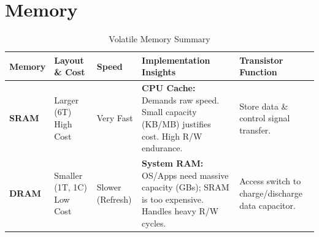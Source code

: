 \documentclass[10pt]{article}
\begin{document}
\section*{Memory}

\begin{table}[H]
    \centering
    \footnotesize %
    \renewcommand{\arraystretch}{1.2} %
    \begin{tabular}{@{} l p{2.2cm} l p{4.5cm} p{3.5cm} @{}}
        \toprule
        \textbf{Memory} & \textbf{Layout \& Cost} & \textbf{Speed} & \textbf{Implementation Insights} & \textbf{Transistor Function} \\
        \midrule
        \textbf{SRAM} & 
        Larger (6T) \newline High Cost & 
        Very Fast & 
        \textbf{CPU Cache:} Demands raw speed. Small capacity (KB/MB) justifies cost. High R/W endurance. & 
        Store data \& control signal transfer. \\
        
        \textbf{DRAM} & 
        Smaller (1T, 1C) \newline Low Cost & 
        Slower \newline (Refresh) & 
        \textbf{System RAM:} OS/Apps need massive capacity (GBs); SRAM is too expensive. Handles heavy R/W cycles. & 
        Access switch to charge/discharge data capacitor. \\
        \bottomrule
    \end{tabular}
    \caption{Volatile Memory Summary}
\end{table}
\end{document}
